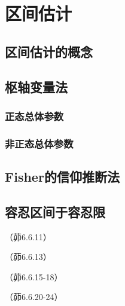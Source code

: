 \chapter{区间估计}

\section{区间估计的概念}

\section{枢轴变量法}

\subsection{正态总体参数}

\subsection{非正态总体参数}

\section{Fisher的信仰推断法}

\section{容忍区间于容忍限}

\begin{problemset}[错题记录]
    \item （茆6.6.11）
    \item （茆6.6.13）
    \item （茆6.6.15-18）
    \item （茆6.6.20-24）
\end{problemset}